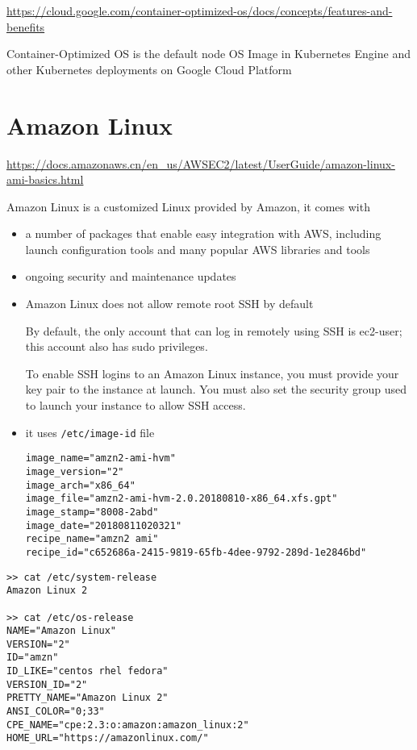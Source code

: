 \url{https://cloud.google.com/container-optimized-os/docs/concepts/features-and-benefits}

Container-Optimized OS is the default node OS Image in Kubernetes Engine and other Kubernetes deployments on Google Cloud Platform


\section{Amazon Linux}
\label{sec:Amazon-Linux}

\url{https://docs.amazonaws.cn/en_us/AWSEC2/latest/UserGuide/amazon-linux-ami-basics.html}


Amazon Linux is a customized Linux provided by Amazon, it comes with 
\begin{itemize}
  \item  a number of packages that enable easy integration with AWS, including launch configuration tools and many popular AWS libraries and tools
  \item  ongoing security and maintenance updates
  
  \item Amazon Linux does not allow remote root SSH by default

By default, the only account that can log in remotely using SSH is ec2-user;
this account also has sudo privileges.

To enable SSH logins to an Amazon Linux instance, you must provide your key pair
to the instance at launch. You must also set the security group used to launch
your instance to allow SSH access.

   \item it uses \verb!/etc/image-id! file
   
\begin{verbatim}
image_name="amzn2-ami-hvm"
image_version="2"
image_arch="x86_64"
image_file="amzn2-ami-hvm-2.0.20180810-x86_64.xfs.gpt"
image_stamp="8008-2abd"
image_date="20180811020321"
recipe_name="amzn2 ami"
recipe_id="c652686a-2415-9819-65fb-4dee-9792-289d-1e2846bd"
\end{verbatim}
\end{itemize}

\begin{verbatim}
>> cat /etc/system-release
Amazon Linux 2

>> cat /etc/os-release
NAME="Amazon Linux"
VERSION="2"
ID="amzn"
ID_LIKE="centos rhel fedora"
VERSION_ID="2"
PRETTY_NAME="Amazon Linux 2"
ANSI_COLOR="0;33"
CPE_NAME="cpe:2.3:o:amazon:amazon_linux:2"
HOME_URL="https://amazonlinux.com/"
\end{verbatim}




